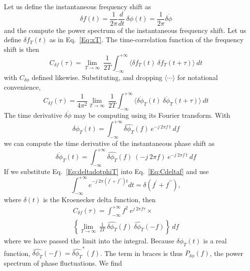 \documentclass[twocolumn,pre,nobalancelastpage]{revtex4}
\begin{document}
Let us define the instantaneous frequency shift as
\begin{equation}
\delta f(t)= \frac{1}{2 \pi} \frac{d}{d t} \: \delta \phi(t) = \frac{1}{2 \pi} \delta \dot{\phi}
\end{equation}
and the compute the power spectrum of the instantaneous frequency shift.  Let us define $\delta f_{T}(t)$  as in Eq.~\ref{Eq:xT}.  The time-correlation function of the frequency shift is then
\begin{equation}
C_{\delta f}(\tau) = \lim_{T \rightarrow \infty} \: \frac{1}{2 T}
\int_{-\infty}^{+\infty} \langle \delta f_{T}(t) \: \delta f_{T}(t+\tau) \rangle \: dt
\end{equation}
with $C_{\delta \phi}$ defined likewise.  Substituting, and dropping $\langle \cdots \rangle$ for notational convenience,
\begin{equation}
C_{\delta f}(\tau) = \frac{1}{4 \pi^2} \lim_{T \rightarrow \infty} \: \frac{1}{2 T}
\int_{-\infty}^{+\infty} \langle \delta \dot{\phi}_{T}(t) \: \delta \dot{\phi}_{T}(t+\tau) \rangle \: dt
\label{Eq:Cdeltaf}
\end{equation}
The time derivative $\delta \dot{\phi}$ may be computing using its Fourier transform.  With
\begin{equation}
\delta \phi_T(t) = \int_{-\infty}^{+\infty} \widehat{\delta \phi_T}(f) \: e^{-j \: 2 \pi f \: t} \: df
\end{equation}
we can compute the time derivative of the instantaneous phase shift as
\begin{equation}
\delta \dot{\phi}_T(t) = \int_{-\infty}^{+\infty} \widehat{\delta \phi_T}(f) \: (-j \: 2 \pi f) \: e^{-j \: 2 \pi f \: t} \: df
\label{Eq:deltadotphiT}
\end{equation}
If we substitute Eq.~\ref{Eq:deltadotphiT} into Eq.~\ref{Eq:Cdeltaf} and use
\begin{equation}
\int_{-\infty}^{+\infty} e^{-j \: 2 \pi (f^{\prime}+f^{\prime\prime}) t } dt = \delta(f^{\prime}+f^{\prime\prime}),
\end{equation}
where $\delta(t)$ is the Kroenecker delta function, then
\begin{multline}
C_{\delta f}(\tau) = \int_{-\infty}^{+\infty}
f^2 \: e^{j \: 2 \pi f \tau} \times \\
\left\{ \lim_{T \rightarrow \infty} \: \frac{1}{2 T} \: \widehat{\delta \phi_T}(f) \: \widehat{\delta \phi_T}(-f) \right\}
 \: df
\end{multline}
where we have passed the limit into the integral.  Because $\delta \phi_T(t)$ is a real function, $\widehat{\delta \phi_T}(-f) = \widehat{\delta \phi_T}^{*}\!\!(f)$.  The term in braces is thus $P_{\delta \phi}(f)$, the power spectrum of phase fluctuations.   We find
\end{document}
